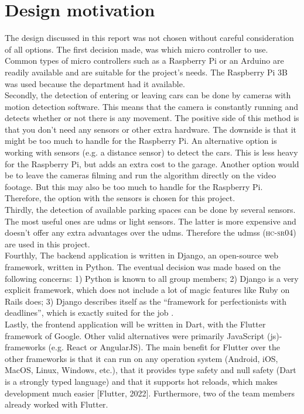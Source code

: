\section{Design motivation}\label{sec:design-motivation}
The design discussed in this report was not chosen without careful consideration of all options. The first decision made, was which micro controller to use. Common types of micro controllers such as a Raspberry Pi or an Arduino are readily available and are suitable for the project's needs. The Raspberry Pi 3B was used because the department had it available. \\

Secondly, the detection of entering or leaving cars can be done by cameras with motion detection software. This means that the camera is constantly running and detects whether or not there is any movement. The positive side of this method is that you don't need any sensors or other extra hardware. The downside is that it might be too much to handle for the Raspberry Pi. An alternative option is working with sensors (e.g. a distance sensor) to detect the cars. This is less heavy for the Raspberry Pi, but adds an extra cost to the garage. Another option would be to leave the cameras filming and run the algorithm directly on the video footage. But this may also be too much to handle for the Raspberry Pi. Therefore, the option with the sensors is chosen for this project. \\

Thirdly, the detection of available parking spaces can be done by several sensors. The most useful ones are \ac{udms} or light sensors. The latter is more expensive and doesn't offer any extra advantages over the \ac{udms}. Therefore the \ac{udms}s (\textsc{hc-sr04}) are used in this project.\\

Fourthly, The backend application is written in Django, an open-source web framework, written in Python. The eventual decision was made based on the following concerns: 1) Python is known to all group members; 2) Django is a very explicit framework, which does not include a lot of magic features like Ruby on Rails does; 3) Django describes itself as the ``framework for perfectionists with deadlines'', which is exactly suited for the job \cite{django_website}. \\

Lastly, the frontend application will be written in Dart, with the Flutter framework of Google. Other valid alternatives were primarily JavaScript (\ac{js})-frameworks (e.g. React or AngularJS). The main benefit for Flutter
over the other frameworks is that it can run on any operation system (Android, iOS, MacOS, Linux, Windows,
etc.), that it provides type safety and null safety (Dart is a strongly typed language) and that it supports
hot reloads, which makes development much easier [Flutter, 2022]. Furthermore, two of the team members
already worked with Flutter. \\

